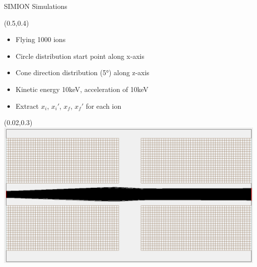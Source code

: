 \documentclass[10pt,aspectratio=169]{beamer}
\begin{document}
\begin{frame}{SIMION Simulations}
    \begin{textblock*}{0.5\paperwidth}(0.5\paperwidth,0.4\paperheight)
        \centering
        \begin{itemize}
            \item Flying 1000 ions
            \item Circle distribution start point along x-axis
            \item Cone direction distribution (5°) along z-axis
            \item Kinetic energy 10keV, acceleration of 10keV
            \item Extract $x_i$, $x_i'$, $x_f$, $x_f'$ for each ion
        \end{itemize}
    \end{textblock*}
    \begin{textblock*}{0.5\paperwidth}(0.02\paperwidth,0.3\paperheight)
			\centering
			\includegraphics[width=.9\textwidth]{Exercises_presentation/images/SimionScreenshot.png}
		\end{textblock*}
  
\end{frame}
\end{document}
